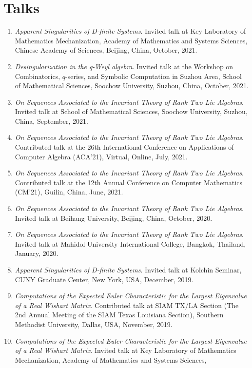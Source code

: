 \documentclass[a4paper,12pt]{article}
\begin{document}
\section*{\Large{Talks}}
\begin{enumerate}
\item {\em Apparent Singularities of D-finite Systems}.
Invited talk at Key Laboratory of Mathematics Mechanization, Academy of Mathematics and Systems Sciences,
 Chinese Academy of Sciences, Beijing, China, October, 2021. 
 \item {\em Desingularization in the q-Weyl algebra}. 
 Invited talk at the Workshop on Combinatorics, $q$-series, and Symbolic Computation in Suzhou Area, School of Mathematical Sciences, Soochow University, Suzhou, China, October, 2021.
\item {\em On Sequences Associated to the Invariant Theory of Rank Two Lie Algebras}.
Invited talk at School of Mathematical Sciences, Soochow University, Suzhou, 
China, September, 2021.
\item {\em On Sequences Associated to the Invariant Theory of Rank Two Lie Algebras}.
Contributed talk at the 26th International Conference on Applications of Computer Algebra (ACA'21), Virtual, Online, July, 2021.
\item {\em On Sequences Associated to the Invariant Theory of Rank Two Lie Algebras}.
Contributed talk at the 12th Annual Conference on Computer Mathematics (CM'21), Guilin, China, June, 2021.
\item {\em On Sequences Associated to the Invariant Theory of Rank Two Lie Algebras}.
Invited talk at Beihang University, Beijing, China, October, 2020.
\item {\em On Sequences Associated to the Invariant Theory of Rank Two Lie Algebras}.
Invited talk at Mahidol University International College, Bangkok, Thailand, January, 2020.
\item {\em Apparent Singularities of D-finite Systems}.
Invited talk at Kolchin Seminar, CUNY Graduate Center, New York, USA, December, 2019. 
\item {\em Computations of the Expected Euler Characteristic for the Largest Eigenvalue of a Real Wishart Matrix}.
Contributed talk at SIAM TX/LA Section (The 2nd Annual Meeting of the SIAM Texas Louisiana Section), Southern Methodist University, Dallas, USA, November, 2019.
\item {\em Computations of the Expected Euler Characteristic for the Largest Eigenvalue of a Real Wishart Matrix}.
Invited talk at Key Laboratory of Mathematics Mechanization, Academy of Mathematics and Systems Sciences,

\end{enumerate}
\end{document}

